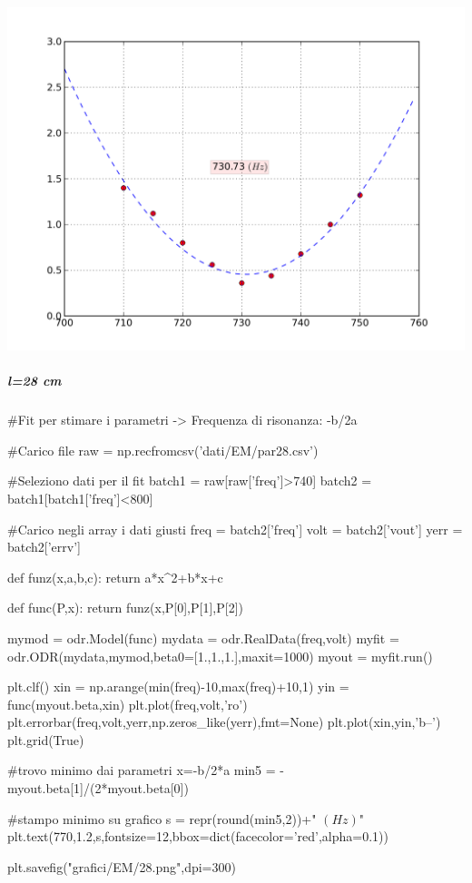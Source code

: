 \includegraphics[scale=0.75]{grafici/EM/32.png}

\subparagraph*{l=28 cm}

\begin{sagesilent}
 #Fit per stimare i parametri -> Frequenza di risonanza: -b/2a

#Carico file
raw = np.recfromcsv('dati/EM/par28.csv')

#Seleziono dati per il fit
batch1 = raw[raw['freq']>740]
batch2 = batch1[batch1['freq']<800]

#Carico negli array i dati giusti
freq = batch2['freq']
volt = batch2['vout']
yerr = batch2['errv']


def funz(x,a,b,c):
    return a*x^2+b*x+c

def func(P,x):
    return funz(x,P[0],P[1],P[2])

mymod = odr.Model(func)
mydata = odr.RealData(freq,volt)
myfit = odr.ODR(mydata,mymod,beta0=[1.,1.,1.],maxit=1000)
myout = myfit.run()

plt.clf()
xin = np.arange(min(freq)-10,max(freq)+10,1)
yin = func(myout.beta,xin)
plt.plot(freq,volt,'ro')
plt.errorbar(freq,volt,yerr,np.zeros_like(yerr),fmt=None)
plt.plot(xin,yin,'b--')
plt.grid(True)

#trovo minimo dai parametri x=-b/2*a
min5 = -myout.beta[1]/(2*myout.beta[0]) 

#stampo minimo su grafico
s = repr(round(min5,2))+" $(Hz)$"
plt.text(770,1.2,s,fontsize=12,bbox=dict(facecolor='red',alpha=0.1))

plt.savefig("grafici/EM/28.png",dpi=300)
\end{sagesilent}

